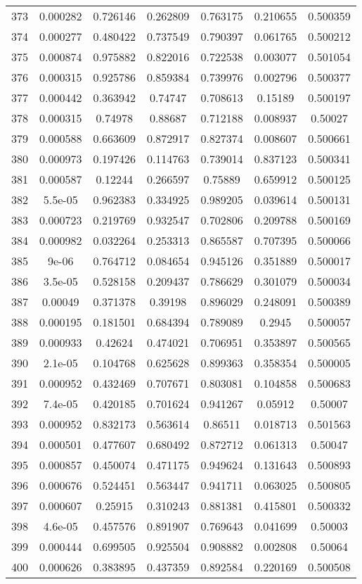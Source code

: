 \begin{table}
\begin{tabular}{c|c|c|c|c|c|c}
373 & 0.000282 & 0.726146 & 0.262809 & 0.763175 & 0.210655 & 0.500359\\
374 & 0.000277 & 0.480422 & 0.737549 & 0.790397 & 0.061765 & 0.500212\\
375 & 0.000874 & 0.975882 & 0.822016 & 0.722538 & 0.003077 & 0.501054\\
376 & 0.000315 & 0.925786 & 0.859384 & 0.739976 & 0.002796 & 0.500377\\
377 & 0.000442 & 0.363942 & 0.74747 & 0.708613 & 0.15189 & 0.500197\\
378 & 0.000315 & 0.74978 & 0.88687 & 0.712188 & 0.008937 & 0.50027\\
379 & 0.000588 & 0.663609 & 0.872917 & 0.827374 & 0.008607 & 0.500661\\
380 & 0.000973 & 0.197426 & 0.114763 & 0.739014 & 0.837123 & 0.500341\\
381 & 0.000587 & 0.12244 & 0.266597 & 0.75889 & 0.659912 & 0.500125\\
382 & 5.5e-05 & 0.962383 & 0.334925 & 0.989205 & 0.039614 & 0.500131\\
383 & 0.000723 & 0.219769 & 0.932547 & 0.702806 & 0.209788 & 0.500169\\
384 & 0.000982 & 0.032264 & 0.253313 & 0.865587 & 0.707395 & 0.500066\\
385 & 9e-06 & 0.764712 & 0.084654 & 0.945126 & 0.351889 & 0.500017\\
386 & 3.5e-05 & 0.528158 & 0.209437 & 0.786629 & 0.301079 & 0.500034\\
387 & 0.00049 & 0.371378 & 0.39198 & 0.896029 & 0.248091 & 0.500389\\
388 & 0.000195 & 0.181501 & 0.684394 & 0.789089 & 0.2945 & 0.500057\\
389 & 0.000933 & 0.42624 & 0.474021 & 0.706951 & 0.353897 & 0.500565\\
390 & 2.1e-05 & 0.104768 & 0.625628 & 0.899363 & 0.358354 & 0.500005\\
391 & 0.000952 & 0.432469 & 0.707671 & 0.803081 & 0.104858 & 0.500683\\
392 & 7.4e-05 & 0.420185 & 0.701624 & 0.941267 & 0.05912 & 0.50007\\
393 & 0.000952 & 0.832173 & 0.563614 & 0.86511 & 0.018713 & 0.501563\\
394 & 0.000501 & 0.477607 & 0.680492 & 0.872712 & 0.061313 & 0.50047\\
395 & 0.000857 & 0.450074 & 0.471175 & 0.949624 & 0.131643 & 0.500893\\
396 & 0.000676 & 0.524451 & 0.563447 & 0.941711 & 0.063025 & 0.500805\\
397 & 0.000607 & 0.25915 & 0.310243 & 0.881381 & 0.415801 & 0.500332\\
398 & 4.6e-05 & 0.457576 & 0.891907 & 0.769643 & 0.041699 & 0.50003\\
399 & 0.000444 & 0.699505 & 0.925504 & 0.908882 & 0.002808 & 0.50064\\
400 & 0.000626 & 0.383895 & 0.437359 & 0.892584 & 0.220169 & 0.500508\\
\end{tabular}
\end{table}
